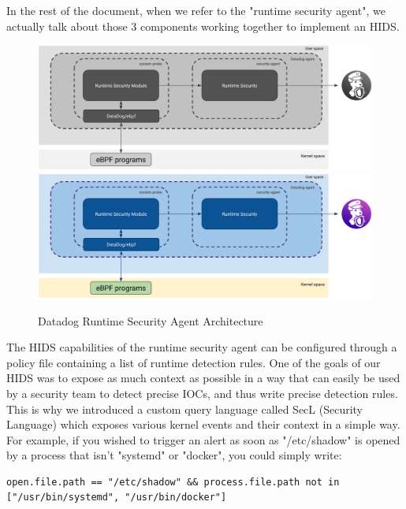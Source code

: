 In the rest of the document, when we refer to the "runtime security agent", we actually talk about those 3 components working together to implement an HIDS.

\begin{figure}[ht]
  \centering
  \ifssticbw
    \includegraphics[width=\textwidth]{RuntimeSecurityMonitoringWithEBPF/img/bw-rsa}
  \else
    \includegraphics[width=\textwidth]{RuntimeSecurityMonitoringWithEBPF/img/rsa}
  \fi
  \caption{Datadog Runtime Security Agent Architecture}
  \label{fig:RuntimeSecurityMonitoringWithEBPF:RSA}
\end{figure}

The HIDS capabilities of the runtime security agent can be configured through a policy file containing a list of runtime detection rules.
One of the goals of our HIDS was to expose as much context as possible in a way that can easily be used by a security team to detect precise IOCs, and thus write precise detection rules.
This is why we introduced a custom query language called SecL (Security Language) which exposes various kernel events and their context in a simple way.
For example, if you wished to trigger an alert as soon as "/etc/shadow" is opened by a process that isn’t "systemd" or "docker", you could simply write:

\begin{lstlisting}[language={},caption={File integrity monitoring rule example},label={lst:RuntimeSecurityMonitoringWithEBPF:FIMRule}]
open.file.path == "/etc/shadow" && process.file.path not in ["/usr/bin/systemd", "/usr/bin/docker"]
\end{lstlisting}

